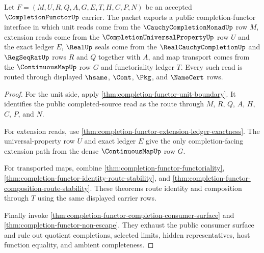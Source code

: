 \begin{theorem}
\label{thm:completion-functor-public-extension-interface}
Let $F=(M,U,R,Q,A,G,E,T,H,C,P,N)$ be an accepted $\CompletionFunctorUp$ carrier. The packet exports a public completion-functor interface in which unit reads come from the $\CauchyCompletionMonadUp$ row $M$, extension reads come from the $\CompletionUniversalPropertyUp$ row $U$ and the exact ledger $E$, $\RealUp$ seals come from the $\RealCauchyCompletionUp$ and $\RegSeqRatUp$ rows $R$ and $Q$ together with $A$, and map transport comes from the $\ContinuousMapUp$ row $G$ and functoriality ledger $T$. Every such read is routed through displayed $\hsame$, $\Cont$, $\Pkg$, and $\NameCert$ rows.
\end{theorem}
\begin{proof}
For the unit side, apply \autoref{thm:completion-functor-unit-boundary}. It identifies the public completed-source read as the route through $M$, $R$, $Q$, $A$, $H$, $C$, $P$, and $N$.

For extension reads, use \autoref{thm:completion-functor-extension-ledger-exactness}. The universal-property row $U$ and exact ledger $E$ give the only completion-facing extension path from the dense $\ContinuousMapUp$ row $G$.

For transported maps, combine \autoref{thm:completion-functor-functoriality}, \autoref{thm:completion-functor-identity-route-stability}, and \autoref{thm:completion-functor-composition-route-stability}. These theorems route identity and composition through $T$ using the same displayed carrier rows.

Finally invoke \autoref{thm:completion-functor-completion-consumer-surface} and \autoref{thm:completion-functor-non-escape}. They exhaust the public consumer surface and rule out quotient completions, selected limits, hidden representatives, host function equality, and ambient completeness.
\end{proof}

